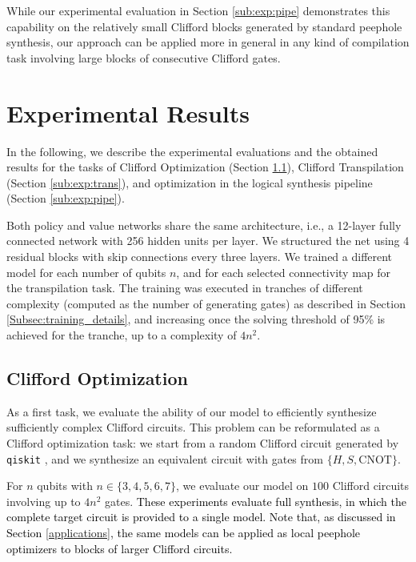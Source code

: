 \documentclass[conference]{IEEEtran}
\newcommand{\nt}[1]{\textcolor{black}{#1}}
\begin{document}
While our experimental evaluation in Section \ref{sub:exp:pipe} demonstrates this capability on the relatively small Clifford blocks generated by standard peephole synthesis, our approach can be applied more in general in any kind of compilation task involving large blocks of consecutive Clifford gates.


\section{Experimental Results}
\label{sec:exp}

In the following, we describe the experimental evaluations and the obtained results for the tasks of Clifford Optimization (Section \ref{sub:exp:opt}), Clifford Transpilation (Section \ref{sub:exp:trans}), and optimization in the logical synthesis pipeline (Section \ref{sub:exp:pipe}).

Both policy and value networks share the same architecture, i.e., a 12-layer fully connected network with 256 hidden units per layer. We structured the net using 4 residual blocks with skip connections every three layers.
We trained a different model for each number of qubits $n$, and for each selected connectivity map  for the transpilation task. The training was executed in tranches of different complexity (computed as the number of generating gates) as described in Section \ref{Subsec:training_details}, 
 and increasing once the solving threshold of 95\% is achieved for the tranche, up to a complexity of $4n^2$.

\subsection{Clifford Optimization}
\label{sub:exp:opt}

As a first task, we evaluate the ability of our model to efficiently synthesize sufficiently complex Clifford circuits. This problem can be reformulated as a Clifford optimization task: we start from a random Clifford circuit generated by \texttt{qiskit} \cite{qiskit}, and we synthesize an equivalent circuit with gates from $\{H, S, \text{CNOT}\}$. 

For $n$ qubits with $n\in\{3,4,5,6,7\}$, we evaluate our model on $100$ Clifford circuits  involving up to $4n^2$ gates. \nt{These experiments evaluate full synthesis, in which the complete target circuit is provided to a single model. Note that, as discussed in Section \ref{applications}, the same models can be applied as local peephole optimizers to blocks of larger Clifford circuits.}
\end{document}
